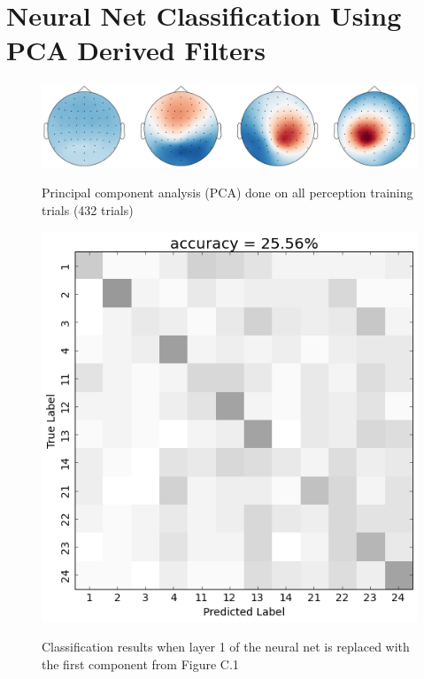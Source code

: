 \chapter{Neural Net Classification Using PCA Derived Filters} \label{appendix:PCAInvestigation}
\begin{figure}[htbp] 
  \begin{center}
   \includegraphics[width=.5\textwidth,keepaspectratio=true]{Figures/PCA_SVM}
   \\\vspace{-0.8em}
    \caption{Principal component analysis (PCA) done on all perception training trials (432 trials)}
    \label{fig:PCA_SVM}
  \end{center}
\end{figure}
\begin{figure}[htbp] 
  \begin{center}
    \includegraphics[scale=0.5]{Figures/PC0_confusion}
   \\\vspace{-0.8em}
    \caption{Classification results when layer 1 of the neural net is replaced with the first component from Figure C.1}
    \label{fig:PC0_confusion}
  \end{center}
\end{figure}
